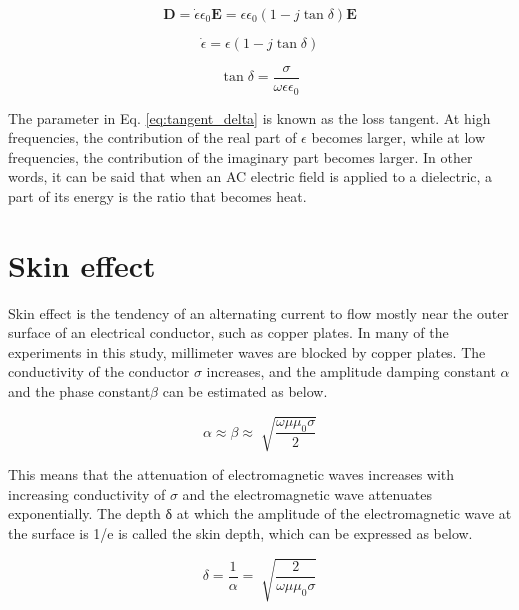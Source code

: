 \documentclass[a4paper,11pt]{jsarticle}
\begin{document}
\begin{equation} \label{eq:electric_flux_density_tangent_delta}
  \boldsymbol{D} = \dot{\epsilon} \epsilon_0 \boldsymbol{E} = \epsilon \epsilon_0 (1 - j\tan\delta)\boldsymbol{E}
\end{equation}

\begin{equation} \label{eq:epsilon_dot}
  \dot{\epsilon} = \epsilon (1 - j\tan\delta)
\end{equation}

\begin{equation} \label{eq:tangent_delta}
  \tan \delta = \frac{\sigma}{\omega\epsilon\epsilon_0}
\end{equation}

The parameter in Eq. \ref{eq:tangent_delta} is known as the loss tangent.
At high frequencies, the contribution of the real part of $\epsilon$ becomes larger,
while at low frequencies, the contribution of the imaginary part becomes larger.
In other words, it can be said that when an AC electric field is applied to a dielectric,
a part of its energy is the ratio that becomes heat.

\section{Skin effect}

Skin effect is the tendency of an alternating current to flow mostly near
the outer surface of an electrical conductor, such as copper plates.
In many of the experiments in this study, 
millimeter waves are blocked by copper plates.
The conductivity of the conductor $\sigma$ increases,
and the amplitude damping constant $\alpha$ and the phase constant$\beta$
can be estimated as below.

\begin{equation}
  \alpha \approx \beta \approx \sqrt[]{\frac{\omega\mu\mu_0\sigma}{2}}
\end{equation}

This means that the attenuation of electromagnetic waves increases with increasing conductivity of $\sigma$
and the electromagnetic wave attenuates exponentially.
The depth δ at which the amplitude of the electromagnetic wave
at the surface is 1/e is called the skin depth, which can be expressed as below.

\begin{equation}
  \delta = \frac{1}{\alpha} = \sqrt[]{\frac{2}{\omega\mu\mu_0\sigma}}
\end{equation}
\end{document}
